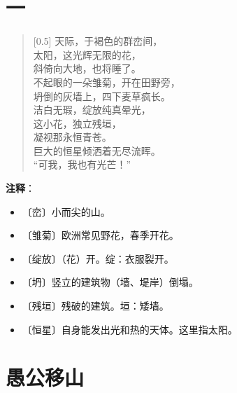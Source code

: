 \documentclass[12pt,UTF-8,openany]{ctexbook}
\begin{document}
\chapter{一}

\begin{large}
    
    \begin{verse}[0.5\linewidth]
        天际，于褐色的群峦间， \\
        太阳，这光辉无限的花， \\
        斜倚向大地，也将睡了。 \\
        不起眼的一朵雏菊，开在田野旁， \\
        坍倒的灰墙上，四下麦草疯长。 \\
        洁白无瑕，绽放纯真晕光， \\
        这小花，独立残垣， \\
        凝视那永恒青苍。 \\
        巨大的恒星倾洒着无尽流晖。 \\
        “可我，我也有光芒！”
    \end{verse}
    
\end{large}


\newpage

\textbf{注释}：

\vspace{-1em}

\begin{itemize}
    \setlength\itemsep{-0.2em}
    \item 〔峦〕小而尖的山。
    \item 〔雏菊〕欧洲常见野花，春季开花。
    \item 〔绽放〕（花）开。绽：衣服裂开。
    \item 〔坍〕竖立的建筑物（墙、堤岸）倒塌。
    \item 〔残垣〕残破的建筑。垣：矮墙。
    \item 〔恒星〕自身能发出光和热的天体。这里指太阳。
\end{itemize}

\chapter{愚公移山}
\end{document}
